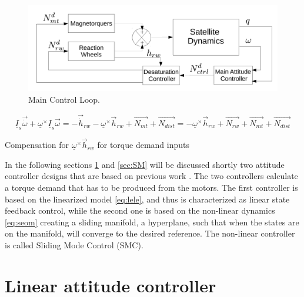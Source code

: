 \begin{figure}[h!]
	\centering 
	\includegraphics[width=160mm]{figures/mainLoop.pdf}	
	\caption{Main Control Loop.}
	\label{fig:mainLoop}
\end{figure}


		\begin{equation}
		\underline{I}_{s}\vec{\dot{\omega}} + \underline{\omega}^\times\underline{I}_{s}\vec{\omega} = -\vec{\dot{h}}_{rw} -  \underline{\omega}^\times \vec{{h}}_{rw} + \vec{N_{mt}}  + \vec{N_{dist}} =  -  \underline{\omega}^\times \vec{{h}}_{rw} + \vec{N_{rw}} + \vec{N_{mt}}  + \vec{N_{dist}} 
		\end{equation}
		
		Compensation for $\underline{\omega}^\times \vec{{h}}_{rw}$ for torque demand inputs  




In the following sections \ref{sec:LC} and \ref{sec:SM}  will be discussed shortly two attitude controller designs that are based on previous work \cite{PrevPro}. The two controllers calculate a torque demand that has to be produced from the motors. The first controller is based on the linearized model \eqref{eq:lele}, and thus is characterized as linear state feedback control, while the second one is based on the non-linear dynamics \eqref{eq:seom} creating a sliding manifold, a hyperplane, such that when the states are on the manifold, will converge to the desired reference. The non-linear controller is called Sliding Mode Control (SMC).

\section{Linear attitude controller} \label{sec:LC}

